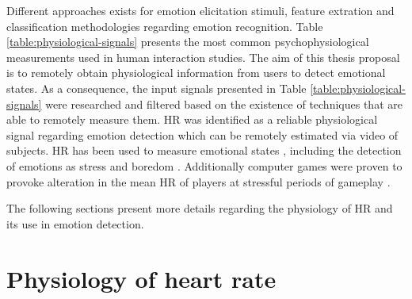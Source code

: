 Different approaches exists for emotion elicitation stimuli, feature extration and classification methodologies regarding emotion recognition. Table \ref{table:physiological-signals} presents the most common psychophysiological measurements used in human interaction studies. The aim of this thesis proposal is to remotely obtain physiological information from users to detect emotional states. As a consequence, the input signals presented in Table \ref{table:physiological-signals} were researched and filtered based on the existence of techniques that are able to remotely measure them. HR was identified as a reliable physiological signal regarding emotion detection which can be remotely estimated via video of subjects. HR has been used to measure emotional states \parencite{kivikangas2011review}, including the detection of emotions as stress \parencite{choi2009using} and boredom \parencite{yamakoshi2007preliminary}. Additionally computer games were proven to provoke alteration in the mean HR of players at stressful periods of gameplay \parencite{sharma2006assessment,rodriguez2015vr}.

The following sections present more details regarding the physiology of HR and its use in emotion detection.



\section{Physiology of heart rate}

